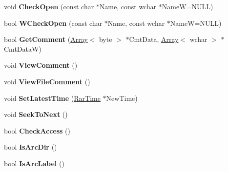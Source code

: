 \begin{DoxyCompactItemize}
\item 
\hypertarget{class_archive_a70ba18001ceb4090b91844fecff46b10}{void {\bfseries Check\-Open} (const char $\ast$Name, const wchar $\ast$Name\-W=N\-U\-L\-L)}\label{class_archive_a70ba18001ceb4090b91844fecff46b10}

\item 
\hypertarget{class_archive_ad9aedb27eb3fcd5848fc0be9d238eb1e}{bool {\bfseries W\-Check\-Open} (const char $\ast$Name, const wchar $\ast$Name\-W=N\-U\-L\-L)}\label{class_archive_ad9aedb27eb3fcd5848fc0be9d238eb1e}

\item 
\hypertarget{class_archive_a6f5a06a23d7b3fe0f2929f18f58056d8}{bool {\bfseries Get\-Comment} (\hyperlink{class_array}{Array}$<$ byte $>$ $\ast$Cmt\-Data, \hyperlink{class_array}{Array}$<$ wchar $>$ $\ast$Cmt\-Data\-W)}\label{class_archive_a6f5a06a23d7b3fe0f2929f18f58056d8}

\item 
\hypertarget{class_archive_a8e9c5a413ed09137211efaadbec15497}{void {\bfseries View\-Comment} ()}\label{class_archive_a8e9c5a413ed09137211efaadbec15497}

\item 
\hypertarget{class_archive_a0ee8d38d7e10c3082ff8920424d9ce71}{void {\bfseries View\-File\-Comment} ()}\label{class_archive_a0ee8d38d7e10c3082ff8920424d9ce71}

\item 
\hypertarget{class_archive_afb2478c77b30b6db8aa6f535dd34bb97}{void {\bfseries Set\-Latest\-Time} (\hyperlink{class_rar_time}{Rar\-Time} $\ast$New\-Time)}\label{class_archive_afb2478c77b30b6db8aa6f535dd34bb97}

\item 
\hypertarget{class_archive_a829861373cc7dee2c5cf8541e8474a8a}{void {\bfseries Seek\-To\-Next} ()}\label{class_archive_a829861373cc7dee2c5cf8541e8474a8a}

\item 
\hypertarget{class_archive_aee9f2dc996825c7bcf87f35e664ee597}{bool {\bfseries Check\-Access} ()}\label{class_archive_aee9f2dc996825c7bcf87f35e664ee597}

\item 
\hypertarget{class_archive_aab5d0e2308454b14301718daf08d3286}{bool {\bfseries Is\-Arc\-Dir} ()}\label{class_archive_aab5d0e2308454b14301718daf08d3286}

\item 
\hypertarget{class_archive_a1d7c46b19c25dea0c1fcae0fa8324049}{bool {\bfseries Is\-Arc\-Label} ()}\label{class_archive_a1d7c46b19c25dea0c1fcae0fa8324049}


\end{DoxyCompactItemize}

